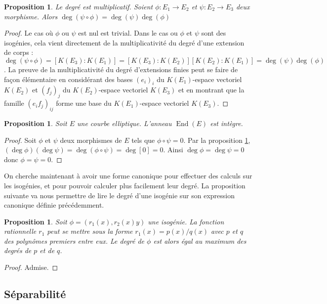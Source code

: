 \documentclass{article}
\theoremstyle{plain}%
\newtheorem{prop}[thm]{Proposition}
\theoremstyle{definition}%
\DeclareMathOperator{\End}{End}
\begin{document}
\begin{prop}
  \label{mul_deg}
  Le degré est multiplicatif. Soient $\phi : E_1\to E_2$ et $\psi : E_2\to E_3$ deux morphisme. Alors $\deg(\psi \circ \phi) = \deg(\psi)\deg(\phi)$ 
\end{prop}

\begin{proof}
  Le cas où $\phi$ ou $\psi$ est nul est trivial. Dans le cas ou $\phi$ et $\psi$ sont des isogénies, cela vient directement de la multiplicativité du degré d'une extension de corps : $\deg(\psi \circ \phi) = [K(E_3) :K(E_1)] = [K(E_3):K(E_2)][K(E_2):K(E_1)] = \deg(\psi)\deg(\phi)$. La preuve de la multiplicativité du degré d'extensions finies peut se faire de façon élémentaire en considérant des bases $(e_i)_i$ du $K(E_1)$-espace vectoriel $K(E_2)$ et $(f_j)_j$ du $K(E_2)$-espace vectoriel $K(E_3)$ et en montrant que la famille $(e_if_j)_{ij}$ forme une base du $K(E_1)$-espace vectoriel $K(E_3)$.
\end{proof}


\begin{prop}
  Soit $E$ une courbe elliptique. L'anneau $\End(E)$ est intègre.
\end{prop}

\begin{proof}
  Soit $\phi$ et $\psi$ deux morphismes de $E$ tels que $\phi \circ \psi = 0$. 
Par la proposition \ref{mul_deg}, $(\deg \phi)(\deg \psi) = \deg(\phi \circ \psi) = \deg[0] = 0$. Ainsi $\deg \phi = \deg \psi = 0$ donc $\phi = \psi = 0$.
\end{proof}

On cherche maintenant à avoir une forme canonique pour effectuer des calculs sur les isogénies, et pour pouvoir calculer plus facilement leur degré.
La proposition suivante va nous permettre de lire le degré d'une isogénie sur son expression canonique définie précédemment.

\begin{prop}
  \label{caracdeg}
  Soit $\phi = (r_1(x), r_2(x)y)$ une isogénie. La fonction rationnelle $r_1$ peut se mettre sous la forme $r_1(x) = p(x) / q(x)$ avec $p$ et $q$ des polynômes premiers entre eux. Le degré de $\phi$ est alors égal au maximum des degrés de $p$ et de $q$. 
\end{prop}

\begin{proof}
  Admise. 
\end{proof}

\subsection{Séparabilité}
\end{document}
